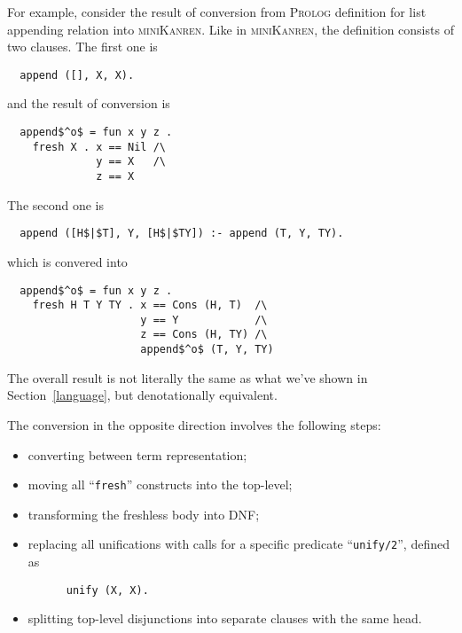 For example, consider the result of conversion from \textsc{Prolog} definition for list appending relation into \textsc{miniKanren}.
Like in \textsc{miniKanren}, the definition consists of two clauses. The first one is

\begin{lstlisting}
  append ([], X, X).
\end{lstlisting}

and the result of conversion is

\begin{lstlisting}
  append$^o$ = fun x y z .
    fresh X . x == Nil /\
              y == X   /\
              z == X
\end{lstlisting}

The second one is

\begin{lstlisting}
  append ([H$|$T], Y, [H$|$TY]) :- append (T, Y, TY).
\end{lstlisting}

which is convered into

\begin{lstlisting}
  append$^o$ = fun x y z .
    fresh H T Y TY . x == Cons (H, T)  /\
                     y == Y            /\
                     z == Cons (H, TY) /\
                     append$^o$ (T, Y, TY)
\end{lstlisting}

The overall result is not literally the same as what we've shown in Section~\ref{language}, but denotationally equivalent.

The conversion in the opposite direction involves the following steps:

\begin{itemize}
  \item converting between term representation;
  \item moving all ``\lstinline|fresh|'' constructs into the top-level;
  \item transforming the freshless body into DNF;
  \item replacing all unifications with calls for a specific predicate ``\lstinline|unify/2|'', defined as

    \begin{lstlisting}
      unify (X, X).
    \end{lstlisting}    

  \item splitting top-level disjunctions into separate clauses with the same head.
\end{itemize}

